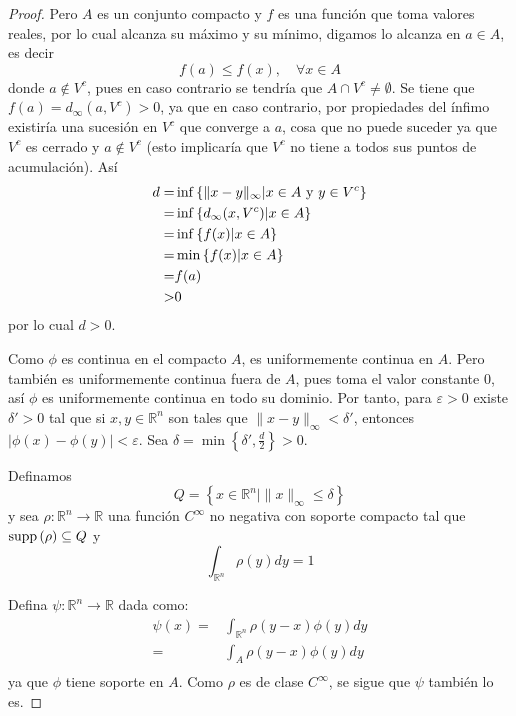 \documentclass[12pt]{report}
\theoremstyle{largebreak}
\newcommand\abs[1]{\ensuremath{\lvert#1\rvert}}
\newcommand\cf[3]{\ensuremath{#1:#2\rightarrow#3}}
\newcommand\supp[1]{\ensuremath{\textup{supp}\left(#1\right)}}
\begin{document}
\begin{proof}
    Pero $A$ es un conjunto compacto y $f$ es una función que toma valores reales, por lo cual alcanza su máximo y su mínimo, digamos lo alcanza en $a\in A$, es decir
    \begin{equation*}
        f(a)\leq f(x),\quad\forall x\in A
    \end{equation*}
    donde $a\notin V^c$, pues en caso contrario se tendría que $A\cap V^c\neq \emptyset$. Se tiene que $f(a)=d_{\infty}(a,V^c)>0$, ya que en caso contrario, por propiedades del ínfimo existiría una sucesión en $V^c$ que converge a $a$, cosa que no puede suceder ya que $V^c$ es cerrado y $a\notin V^c$ (esto implicaría que $V^c$ no tiene a todos sus puntos de acumulación). Así
    \begin{equation*}
        \begin{split}
            d=&\inf\left\{\|x-y\|_{\infty}|x\in A \textup{ y }y\in V^c\right\}\\
            =&\inf\left\{d_{\infty}(x,V^c)|x\in A\right\}\\
            =&\inf\left\{f(x)|x\in A\right\}\\
            =&\min\left\{f(x)|x\in A\right\}\\
            =&f(a)\\
            >&0\\
        \end{split}
    \end{equation*}
    por lo cual $d>0$.
    
    Como $\phi$ es continua en el compacto $A$, es uniformemente continua en $A$. Pero también es uniformemente continua fuera de $A$, pues toma el valor constante $0$, así $\phi$ es uniformemente continua en todo su dominio.
    Por tanto, para $\varepsilon>0$ existe $\delta'>0$ tal que si $x,y\in\mathbb{R}^n$ son tales que $\|x-y\|_{\infty}<\delta'$, entonces $\abs{\phi(x)-\phi(y)}<\varepsilon$. Sea $\delta =\min\left\{\delta',\frac{d}{2}\right\}>0$.
    
    Definamos
    \begin{equation*}
        Q=\left\{x\in\mathbb{R}^n|\|x\|_{\infty}\leq\delta\right\}
    \end{equation*}
    y sea $\cf{\rho}{\mathbb{R}^n}{\mathbb{R}}$ una función $C^{\infty}$ no negativa con soporte compacto tal que $\supp{\rho}\subseteq Q$ y
    \begin{equation*}
        \int_{\mathbb{R}^n}\rho(y)dy=1
    \end{equation*}
    
    Defina $\cf{\psi}{\mathbb{R}^n}{\mathbb{R}}$ dada como:
    \begin{equation*}
        \begin{split}
            \psi(x)=&\int_{\mathbb{R}^n}\rho(y-x)\phi(y)dy\\
            =&\int_{A}\rho(y-x)\phi(y)dy\\
        \end{split}
    \end{equation*}
    ya que $\phi$ tiene soporte en $A$. Como $\rho$ es de clase $C^{\infty}$, se sigue que $\psi$ también lo es.


\end{proof}
\end{document}
